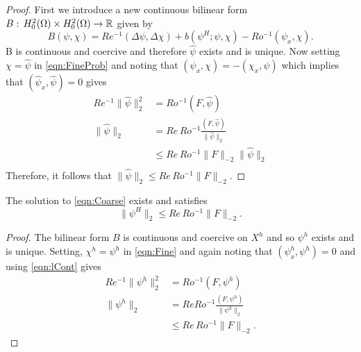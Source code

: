 \begin{proof}
  First we introduce a new continuous bilinear form $B:\, H^2_0(\Omega) \times
  H^2_0(\Omega) \to \mathbb{R}$ given by
  \begin{equation*}
    B(\psi,\chi) = Re^{-1} (\Delta \psi, \Delta \chi)
      + b(\psi^H;\psi,\chi)
      - Ro^{-1} (\psi_x,\chi).
  \end{equation*}
  B is continuous and coercive and therefore $\hat{\psi}$ exists and is unique.
  Now setting $\chi=\hat{\psi}$ in \eqref{eqn:FineProb} and noting that
  $(\psi_x,\chi) = -(\chi_x,\psi)$ which implies that
  $(\hat{\psi}_x,\hat{\psi}) = 0$ gives
  \begin{align*}
    Re^{-1} \|\hat{\psi}\|_2^2 &= Ro^{-1} (F,\hat{\psi}) \\
    \|\hat{\psi}\|_2 &= Re\, Ro^{-1} \frac{(F,\hat{\psi})}{\|\hat{\psi}\|_2} \\
    &\le Re\, Ro^{-1} \|F\|_{-2}\|\hat{\psi}\|_2 \\
  \end{align*}
  Therefore, it follows that $\|\hat{\psi}\|_2 \le Re\, Ro^{-1} \|F\|_{-2}$.
\end{proof}
\begin{lemma} \label{lma:Fineh}
  The solution to \eqref{eqn:Coarse} exists and satisfies
  \begin{equation*}
    \|\psi^H\|_2 \le Re\, Ro^{-1} \|F\|_{-2}.
  \end{equation*}
\end{lemma}
\begin{proof}
  The bilinear form $B$ is continuous and coercive on $X^h$ and so $\psi^h$
  exists and is unique. Setting, $\chi^h=\psi^h$ in \eqref{eqn:Fine} and again
  noting that $(\psi_x^h,\psi^h)=0$ and using \eqref{eqn:lCont} gives
  \begin{align*}
    Re^{-1} \|\psi^h\|_2^2 &= Ro^{-1} (F,\psi^h) \\
    \|\psi^h\|_2 &= Re Ro^{-1} \frac{(F,\psi^h)}{\|\psi^h\|_2} \\
    &\le Re\, Ro^{-1} \|F\|_{-2}.
  \end{align*}
\end{proof}
